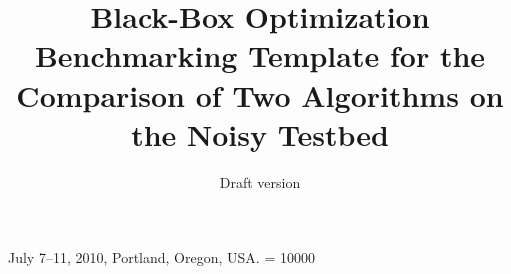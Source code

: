 \documentclass{sig-alternate}
\begin{document}
%
 {July 7--11, 2010, Portland, Oregon, USA.}
\widowpenalty = 10000

\title{Black-Box Optimization Benchmarking Template for the Comparison of Two Algorithms on the Noisy Testbed}
\subtitle{Draft version
}

%
%
%
%
%
\end{document}
